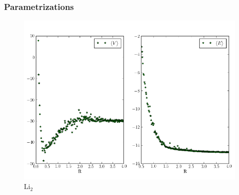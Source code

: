 \documentclass{beamer}
\begin{document}
\begin{frame}\frametitle{Parametrizations}
 \begin{figure}
 \begin{center}
  \includegraphics[scale=0.35]{R_vs_E_lit_pure.png}
  \caption{$\mathrm{Li_2}$}
 \end{center}
\end{figure}
\end{frame}


\subsection*{}

\begin{frame}
 
 
\end{frame}
\end{document}
